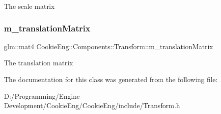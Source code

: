 The scale matrix \mbox{\label{class_cookie_eng_1_1_components_1_1_transform_a8ab2d1886012bb7942ef4e4aafbd0321}} 
\subsubsection{\texorpdfstring{m\+\_\+translation\+Matrix}{m\_translationMatrix}}
{\footnotesize\ttfamily glm\+::mat4 Cookie\+Eng\+::\+Components\+::\+Transform\+::m\+\_\+translation\+Matrix\hspace{0.3cm}{\ttfamily [protected]}}

The translation matrix 

The documentation for this class was generated from the following file\+:\begin{DoxyCompactItemize}
\item 
D\+:/\+Programming/\+Engine Development/\+Cookie\+Eng/\+Cookie\+Eng/include/Transform.\+h\end{DoxyCompactItemize}
